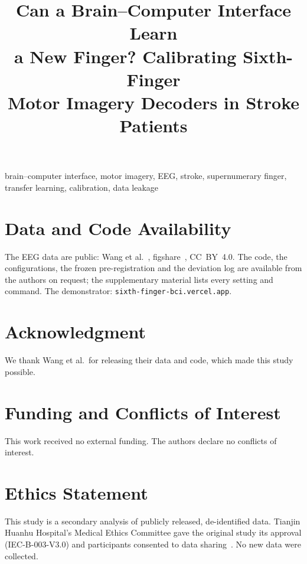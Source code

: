 \documentclass[conference]{IEEEtran}
\begin{document}
\title{Can a Brain--Computer Interface Learn\\ a New Finger? Calibrating Sixth-Finger\\
Motor Imagery Decoders in Stroke Patients}

\author{
}

\maketitle

\begin{abstract}

\end{abstract}

\begin{IEEEkeywords}
brain--computer interface, motor imagery, EEG, stroke, supernumerary finger, transfer learning, calibration, data leakage
\end{IEEEkeywords}









\section*{Data and Code Availability}
{\raggedright
The EEG data are public: Wang et al.~\cite{wang2026dataset}, figshare~\cite{wang2026figshare},
CC~BY~4.0. The code, the configurations, the frozen pre-registration and the
deviation log are available from the authors on request; the supplementary
material lists every setting and command. The demonstrator:
\texttt{sixth-finger-bci.vercel.app}.\par}

\section*{Acknowledgment}
We thank Wang et al.\ for releasing their data and code, which made this
study possible.

\section*{Funding and Conflicts of Interest}
This work received no external funding. The authors declare no conflicts of
interest.

\section*{Ethics Statement}
This study is a secondary analysis of publicly released, de-identified data.
Tianjin Huanhu Hospital's Medical Ethics Committee gave the original study its
approval (IEC-B-003-V3.0) and participants consented to data sharing~\cite{wang2026dataset}.
No new data were collected.



\end{document}
